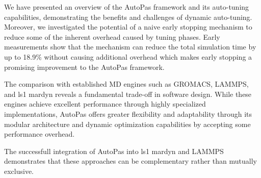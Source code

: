 \documentclass[conference]{IEEEtran}
\begin{document}
We have presented an overview of the AutoPas framework and its auto-tuning capabilities, demonstrating the benefits and challenges of dynamic auto-tuning. Moreover, we investigated the potential of a naive early stopping mechanism to reduce some of the inherent overhead caused by tuning phases.
Early measurements show that the mechanism can reduce the total simulation time by up to 18.9\% without causing additional overhead which makes early stopping a promising improvement to the AutoPas framework.

The comparison with established MD engines such as GROMACS, LAMMPS, and ls1 mardyn reveals a fundamental trade-off in software design. While these engines achieve excellent performance through highly specialized implementations, AutoPas offers greater flexibility and adaptability through its modular architecture and dynamic optimization capabilities by accepting some performance overhead.

The successfull integration of AutoPas into ls1 mardyn and LAMMPS demonstrates that these approaches can be complementary rather than mutually exclusive.

\newpage



\end{document}
